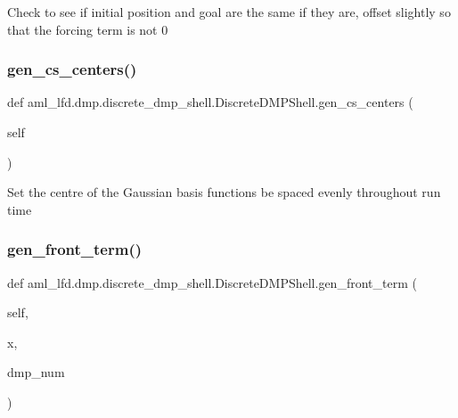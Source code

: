 \begin{DoxyVerb}Check to see if initial position and goal are the same
if they are, offset slightly so that the forcing term is not 0\end{DoxyVerb}
 \hypertarget{classaml__lfd_1_1dmp_1_1discrete__dmp__shell_1_1_discrete_d_m_p_shell_ab364e2625c5983ba748c212e7cc4b16b}{}\label{classaml__lfd_1_1dmp_1_1discrete__dmp__shell_1_1_discrete_d_m_p_shell_ab364e2625c5983ba748c212e7cc4b16b} 
\subsubsection{\texorpdfstring{gen\+\_\+cs\+\_\+centers()}{gen\_cs\_centers()}}
{\footnotesize\ttfamily def aml\+\_\+lfd.\+dmp.\+discrete\+\_\+dmp\+\_\+shell.\+Discrete\+D\+M\+P\+Shell.\+gen\+\_\+cs\+\_\+centers (\begin{DoxyParamCaption}\item[{}]{self }\end{DoxyParamCaption})}

\begin{DoxyVerb}Set the centre of the Gaussian basis 
functions be spaced evenly throughout run time\end{DoxyVerb}
 \hypertarget{classaml__lfd_1_1dmp_1_1discrete__dmp__shell_1_1_discrete_d_m_p_shell_a49cf27ca02e86e1773133835e1f606a2}{}\label{classaml__lfd_1_1dmp_1_1discrete__dmp__shell_1_1_discrete_d_m_p_shell_a49cf27ca02e86e1773133835e1f606a2} 
\subsubsection{\texorpdfstring{gen\+\_\+front\+\_\+term()}{gen\_front\_term()}}
{\footnotesize\ttfamily def aml\+\_\+lfd.\+dmp.\+discrete\+\_\+dmp\+\_\+shell.\+Discrete\+D\+M\+P\+Shell.\+gen\+\_\+front\+\_\+term (\begin{DoxyParamCaption}\item[{}]{self,  }\item[{}]{x,  }\item[{}]{dmp\+\_\+num }\end{DoxyParamCaption})}

